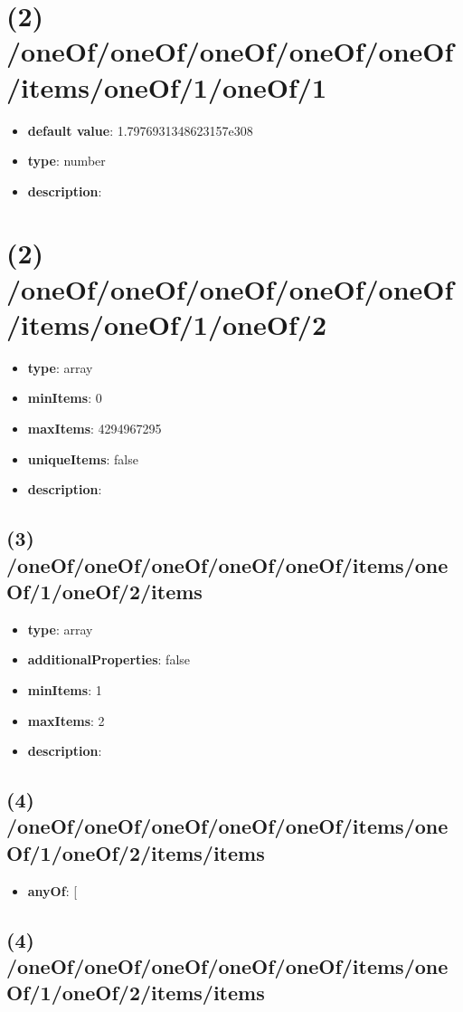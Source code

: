 \section{(2) /oneOf/oneOf/oneOf/oneOf/oneOf/items/oneOf/1/oneOf/1}
\begin{itemize}[leftmargin=2em]\item {\bf default value}: 1.7976931348623157e308
\item {\bf type}: number
\item {\bf description}: 
\end{itemize}\section{(2) /oneOf/oneOf/oneOf/oneOf/oneOf/items/oneOf/1/oneOf/2}
\begin{itemize}[leftmargin=2em]\item {\bf type}: array
\item {\bf minItems}: 0
\item {\bf maxItems}: 4294967295
\item {\bf uniqueItems}: false
\item {\bf description}: 
\end{itemize}\subsection{(3) /oneOf/oneOf/oneOf/oneOf/oneOf/items/oneOf/1/oneOf/2/items}
\begin{itemize}[leftmargin=3em]\item {\bf type}: array
\item {\bf additionalProperties}: false
\item {\bf minItems}: 1
\item {\bf maxItems}: 2
\item {\bf description}: 
\end{itemize}\subsection{(4) /oneOf/oneOf/oneOf/oneOf/oneOf/items/oneOf/1/oneOf/2/items/items}
\begin{itemize}[leftmargin=4em]\item {\bf anyOf}: [\end{itemize}\subsection{(4) /oneOf/oneOf/oneOf/oneOf/oneOf/items/oneOf/1/oneOf/2/items/items}
